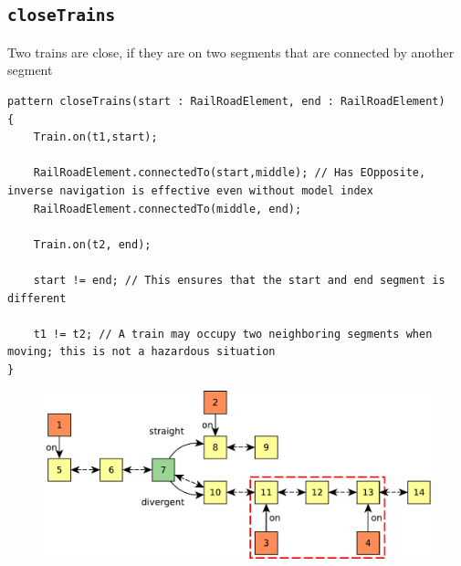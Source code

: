 \subsection{\texttt{closeTrains}}
\begin{minipage}{\textwidth}
Two trains are close, if they are on two segments that are connected by another segment
\begin{lstlisting}[language = vql]
pattern closeTrains(start : RailRoadElement, end : RailRoadElement)
{
	Train.on(t1,start);
	
	RailRoadElement.connectedTo(start,middle); // Has EOpposite, inverse navigation is effective even without model index
	RailRoadElement.connectedTo(middle, end);
	
	Train.on(t2, end);
	
	start != end; // This ensures that the start and end segment is different
	
	t1 != t2; // A train may occupy two neighboring segments when moving; this is not a hazardous situation
}
\end{lstlisting}


\begin{figure}[H]
	\begin{center}
		\includegraphics[width=\textwidth]{figures/query-example-model-closetrains.pdf}
	\end{center}
\end{figure}


\end{minipage}
\vspace{\belowdisplayskip}








